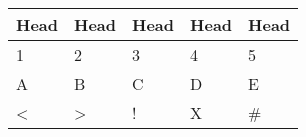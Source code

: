 
\begin{tabular}{@{}lllll@{}}
\toprule
Head        & Head           & Head & Head & Head \\ \midrule
1           & 2              & 3    & 4    & 5    \\
A           & B              & C    & D    & E    \\
\textless{} & \textgreater{} & !    & X    & \#   \\ \bottomrule
\end{tabular}
